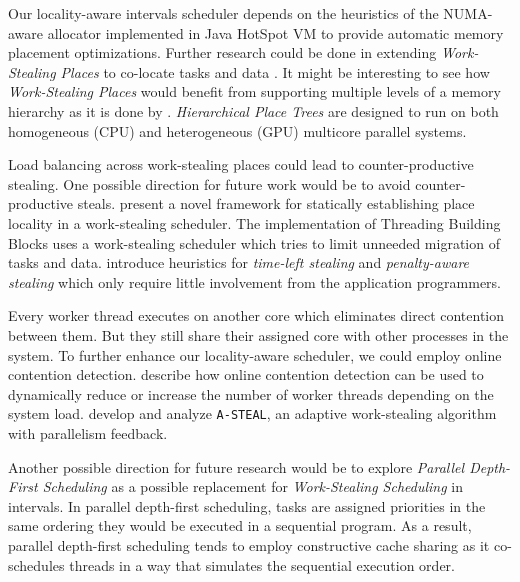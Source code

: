 Our locality-aware intervals scheduler depends on the heuristics of
the NUMA-aware allocator implemented in Java HotSpot VM to provide
automatic memory placement optimizations. Further research could be
done in extending \emph{Work-Stealing Places} to co-locate tasks and
data \cite{HJ, Charles2005, Saraswat2010}. It might be interesting to
see how \emph{Work-Stealing Places} would benefit from supporting
multiple levels of a memory hierarchy as it is done by
\textcite{Yan2009}. \emph{Hierarchical Place Trees} are designed to
run on both homogeneous (CPU) and heterogeneous (GPU) multicore
parallel systems.

Load balancing across work-stealing places could lead to
counter-productive stealing. One possible direction for future work
would be to avoid counter-productive steals. \textcite{Agarwal2008}
present a novel framework for statically establishing place locality
in a work-stealing scheduler. The implementation of Threading Building
Blocks \cite{Contreras2008, Reinders2007} uses a work-stealing
scheduler which tries to limit unneeded migration of tasks and
data. \textcite{Gaud2010} introduce heuristics for \emph{time-left
  stealing} and \emph{penalty-aware stealing} which only require
little involvement from the application programmers.

Every worker thread executes on another core which eliminates direct
contention between them. But they still share their assigned core with
other processes in the system. To further enhance our locality-aware
scheduler, we could employ online contention
detection. \textcite{Mars2010} describe how online contention
detection can be used to dynamically reduce or increase the number of
worker threads depending on the system load. \textcite{Agrawal2007}
develop and analyze \lstinline!A-STEAL!, an adaptive work-stealing
algorithm with parallelism feedback.

Another possible direction for future research would be to explore
\emph{Parallel Depth-First Scheduling} as a possible replacement for
\emph{Work-Stealing Scheduling} in intervals. In parallel depth-first
scheduling, tasks are assigned priorities in the same ordering they
would be executed in a sequential program. As a result, parallel
depth-first scheduling tends to employ constructive cache sharing
\cite{Liaskovitis2006, Chen2007} as it co-schedules threads in a way
that simulates the sequential execution order.


